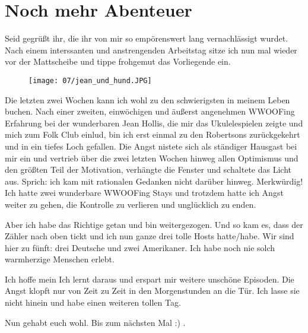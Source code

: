 \chapter{Noch mehr Abenteuer}

Seid gegrüßt ihr, die ihr von mir so empörenswert lang vernachlässigt
wurdet. Nach einem interssanten und anstrengenden Arbeitstag sitze ich
nun mal wieder vor der Mattscheibe und tippe frohgemut das Vorliegende
ein.

\begin{figure}[h]
  \centering
  \texttt{[image: 07/jean\_und\_hund.JPG]}
\end{figure}
Die letzten zwei Wochen kann ich wohl zu den schwierigsten in meinem
Leben buchen. Nach einer zweiten, einwöchigen und äußerst angenehmen
WWOOFing Erfahrung bei der wunderbaren Jean Hollis, die mir das
Ukulelespielen zeigte und mich zum Folk Club einlud, bin ich erst einmal
zu den Robertsons zurückgekehrt und in ein tiefes Loch gefallen. Die
Angst nistete sich als ständiger Hausgast bei mir ein und vertrieb über
die zwei letzten Wochen hinweg allen Optimismus und den größten Teil der
Motivation, verhängte die Fenster und schaltete das Licht aus. Sprich:
ich kam mit rationalen Gedanken nicht darüber hinweg. Merkwürdig! Ich
hatte zwei wunderbare WWOOFing Stays und trotzdem hatte ich Angst weiter
zu gehen, die Kontrolle zu verlieren und unglücklich zu enden.

Aber ich habe das Richtige getan und bin weitergezogen. Und so kam es,
dass der Zähler nach oben tickt und ich nun ganze drei tolle Hosts
hatte/habe. Wir sind hier zu fünft: drei Deutsche und zwei Amerikaner.
Ich habe noch nie solch warmherzige Menschen erlebt.

Ich hoffe mein Ich lernt daraus und erspart mir weitere unschöne
Episoden. Die Angst klopft nur von Zeit zu Zeit in den Morgenstunden an
die Tür. Ich lasse sie nicht hinein und habe einen weiteren tollen Tag.

Nun gehabt euch wohl. Bis zum nächsten Mal :) .
